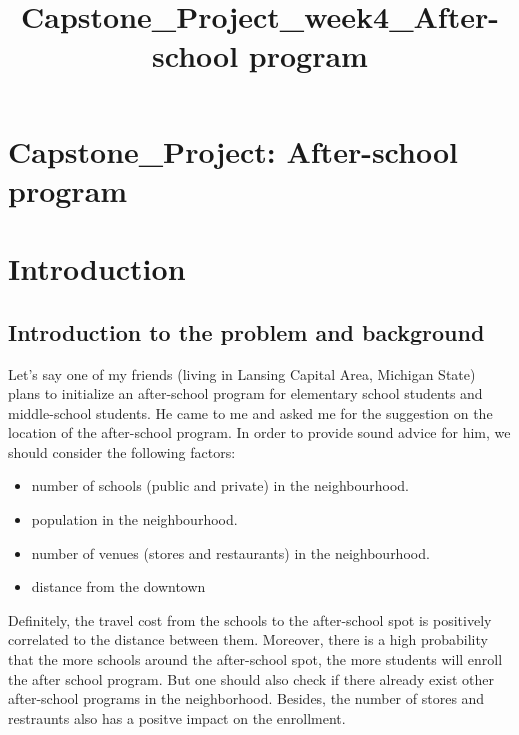 \documentclass[11pt]{article}
\title{Capstone\_Project\_week4\_After-school program}
\providecommand{\tightlist}{%
      \setlength{\itemsep}{0pt}\setlength{\parskip}{0pt}}
\begin{document}
    
    
    \maketitle
    
    

    
    \section{Capstone\_Project: After-school
program}\label{capstone_project-after-school-program}

    \section{Introduction}\label{introduction}

\subsection{Introduction to the problem and
background}\label{introduction-to-the-problem-and-background}

Let's say one of my friends (living in Lansing Capital Area, Michigan
State) plans to initialize an after-school program for elementary school
students and middle-school students. He came to me and asked me for the
suggestion on the location of the after-school program. In order to
provide sound advice for him, we should consider the following factors:

\begin{itemize}
\tightlist
\item
  number of schools (public and private) in the neighbourhood.
\item
  population in the neighbourhood.
\item
  number of venues (stores and restaurants) in the neighbourhood.
\item
  distance from the downtown
\end{itemize}

Definitely, the travel cost from the schools to the after-school spot is
positively correlated to the distance between them. Moreover, there is a
high probability that the more schools around the after-school spot, the
more students will enroll the after school program. But one should also
check if there already exist other after-school programs in the
neighborhood. Besides, the number of stores and restraunts also has a
positve impact on the enrollment.
\end{document}
